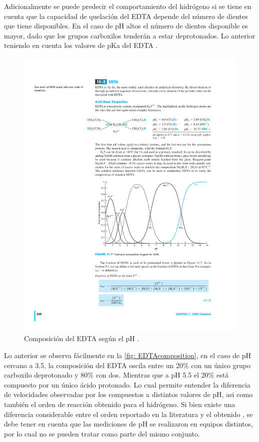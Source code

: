 \documentclass[fleqn,10pt]{SelfArx} %
\begin{document}
	Adicionalmente se puede predecir el comportamiento del hidr\'ogeno si se tiene en cuenta que la capacidad de quelaci\'on del EDTA depende del n\'umero de dientes que tiene disponibles. En el caso de pH altos el n\'umero de dientes disponible es mayor, dado que los grupos carboxilos tender\'an a estar deprotonados. Lo anterior teniendo en cuenta los valores de pKa del EDTA \cite{Harris}.
	\begin{figure}[h]
	    \centering
	    \includegraphics[width=\linewidth]{images/EDTAcomposition.pdf}
	    \caption{Composici\'on del EDTA seg\'un el pH \cite{Harris}.}
	    \label{fig: EDTAcomposition}
	\end{figure}
	
	Lo anterior se observa f\'acilmente en la \autoref{fig: EDTAcomposition}, en el caso de pH cercano a 3.5, la composici\'on del EDTA oscila entre un 20\% con un \'unico grupo carboxilo deprotonado y 80\% con dos. Mientras que a pH 5.5 el 20\% est\'a compuesto por un \'unico \'acido protonado. Lo cual permite entender la diferencia de velocidades observadas por los compuestos a distintos valores de pH, asi como tambi\'en el orden de reacci\'on obtenido para el hidr\'ogeno. Si bien existe una diferencia considerable entre el orden reportado en la literatura y el obtenido \cite{Hedrick}, se debe tener en cuenta que las mediciones de pH se realizaron en equipos distintos, por lo cual no se pueden tratar como parte del mismo conjunto.
	
\end{document}
